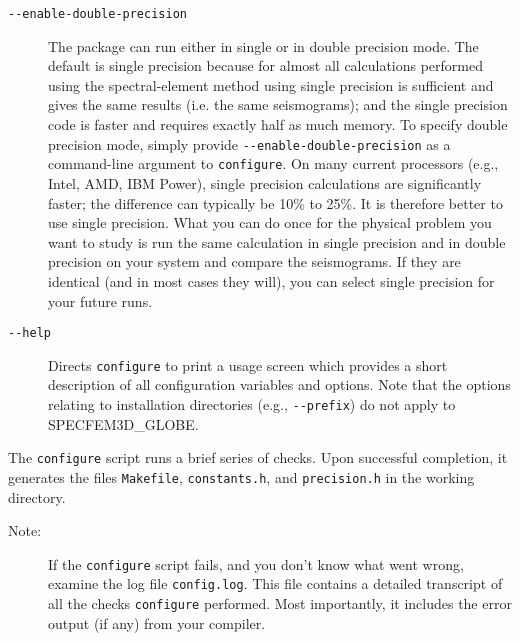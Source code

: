 \begin{description}
\item [{\texttt{-{}-enable-double-precision}}] The package can run either
in single or in double precision mode. The default is single precision
because for almost all calculations performed using the spectral-element method
using single precision is sufficient and gives the same results (i.e. the same seismograms);
and the single precision code is faster and requires exactly half as much memory. To specify
double precision mode, simply provide \texttt{-{}-enable-double-precision}
as a command-line argument to \texttt{configure}.
On many current processors (e.g., Intel, AMD, IBM Power), single precision calculations
are significantly faster; the difference can typically be 10\%
to 25\%. It is therefore better to use single precision.
What you can do once for the physical problem you want to study is run the same calculation in single precision
and in double precision on your system and compare the seismograms.
If they are identical (and in most cases they will), you can select single precision for your future runs.

\item [{\texttt{-{}-help}}] Directs \texttt{configure} to print a usage
screen which provides a short description of all configuration variables
and options. Note that the options relating to installation directories
(e.g., \texttt{-{}-prefix}) do not apply to SPECFEM3D\_GLOBE.
\end{description}

The \texttt{configure} script runs a brief series of checks. Upon
successful completion, it generates the files \texttt{Makefile}, \texttt{constants.h},
and \texttt{precision.h} in the working directory.

\begin{description}
\item [{Note:}] If the \texttt{configure} script fails, and you don't know
what went wrong, examine the log file \texttt{config.log}. This file
contains a detailed transcript of all the checks \texttt{configure}
performed. Most importantly, it includes the error output (if any)
from your compiler.
\end{description}

